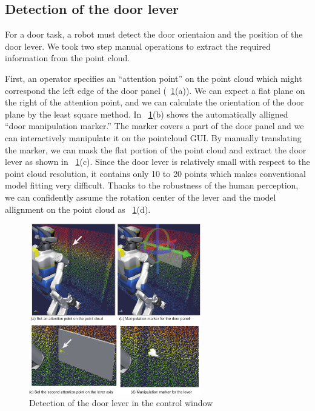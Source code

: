 \subsection{Detection of the door lever}
%
For a door task, a robot must detect the door orientaion and the position 
of the door lever. We took two step manual operations to extract the required information
from the point cloud. %

First, an operator specifies an ``attention point'' on the point cloud which might correspond the 
left edge of the door panel (\figurename~\ref{fig:door_manip_markers}(a)). We can expect a flat plane 
on the right of the attention point, and we can calculate the orientation of the door plane by the least square method.
In \figurename~\ref{fig:door_manip_markers}(b) shows the automatically alligned ``door manipulation marker.''
The marker covers a part of the door panel and we can interactively manipulate it on the 
pointcloud GUI. By manually translating the marker, we can mask the flat portion of 
the point cloud and extract the door lever as shown in \figurename~\ref{fig:door_manip_markers}(c).
Since the door lever is relatively small with respect to the point cloud resolution,
it contains only 10 to 20 points which makes conventional model fitting very difficult.
Thanks to the robustness of the human perception, we can confidently assume the rotation center of the lever
 and the model allignment on the point cloud as \figurename~\ref{fig:door_manip_markers}(d).

\begin{figure}[t]
  \centering
  \includegraphics[width = 7.5cm]{img/door_manipulation_markers}
  \caption{Detection of the door lever in the control window}
  \label{fig:door_manip_markers}
\end{figure}
		

